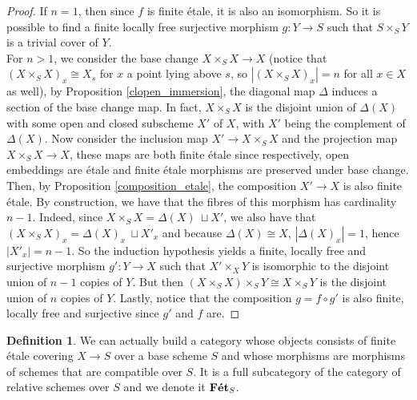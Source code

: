 \documentclass{article}
\theoremstyle{plain}
\theoremstyle{definition}
\newtheorem{definition}[theorem]{Definition}
\DeclareMathOperator{\Fet}{\bf{F\acute{e}t}}
\begin{document}
\begin{proof}
    If $n=1$, then since $f$ is finite \'etale, it is also an isomorphism. So it is possible to find a finite locally free surjective morphism $g:Y\rightarrow S$ such that $S\times_SY$ is a trivial cover of $Y$.\\
    For $n>1$, we consider the base change $X\times_SX\rightarrow X$ 
    (notice that $(X\times_SX)_x \cong X_s$ for $x$ a point lying above $s$, so $|(X\times_SX)_x|=n$ for all $x\in X$ as well), 
    by Proposition \ref{clopen_immersion}, the diagonal map $\Delta$ induces a section of the base change map. In fact, $X\times_SX$ is the disjoint union of $\Delta(X)$ with some open and closed subscheme $X'$ of $X$, with $X'$ being the complement of $\Delta(X)$.
    Now consider the inclusion map $X'\rightarrow X\times_SX$ and the projection map $X\times_SX\rightarrow X$, these maps are both finite \'etale since respectively, open embeddings are \'etale and finite \'etale morphisms are preserved under base change.
    Then, by Proposition \ref{composition_etale}, the composition $X'\rightarrow X$ is also finite \'etale.
    By construction, we have that the fibres of this morphism has cardinality $n-1$.
    Indeed, since $X\times_SX = \Delta(X) \:\sqcup X'$, we also have that $(X\times_SX)_x = \Delta(X)_x \:\sqcup X'_x$ and because $\Delta(X)\cong X$, $|\Delta(X)_x|=1$, hence $|X'_x|=n-1$.
    So the induction hypothesis yields a finite, locally free and surjective morphism $g':Y\rightarrow X$ such that $X'\times_XY$ is isomorphic to the disjoint union of $n-1$ copies of $Y$. But then $(X\times_SX)\times_SY \cong X\times_SY$ is the disjoint union of $n$ copies of $Y$.
    Lastly, notice that the composition $g=f\circ g'$ is also finite, locally free and surjective since $g'$ and $f$ are.
\end{proof}


\begin{definition}
    We can actually build a category whose objects consists of finite \'etale covering $X\rightarrow S$ over a base scheme $S$ and whose morphisms are morphisms of schemes that are compatible over $S$. 
    It is a full subcategory of the category of relative schemes over $S$ and we denote it $\Fet_S$.
\end{definition}
\end{document}
